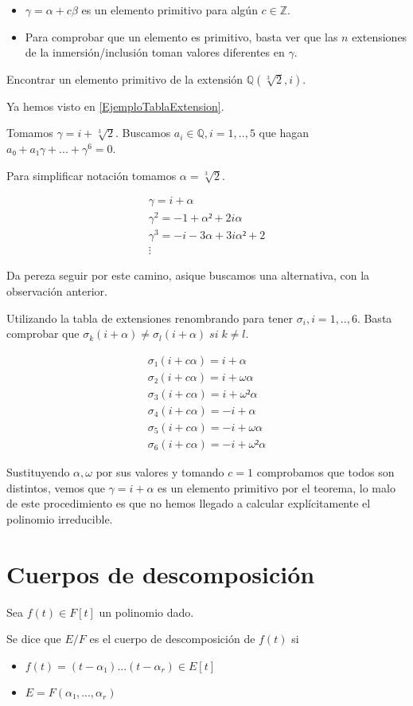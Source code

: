 \documentclass{apuntes}
\begin{document}
\obs
\begin{itemize}
\item $γ=α+cβ$ es un elemento primitivo para algún $c∈ℤ$.
\item Para comprobar que un elemento es primitivo, basta ver que las $n$ extensiones de la inmersión/inclusión toman valores diferentes en $γ$.
\end{itemize}


\begin{example}
Encontrar un elemento primitivo de la extensión $ℚ(\sqrt[3]{2},i)$.

Ya hemos visto en \ref{EjemploTablaExtension}.

Tomamos $γ=i+\sqrt[3]{2}$. Buscamos $a_i ∈ℚ, i=1,..,5$ que hagan $a₀  + a₁γ + ... + γ^6 = 0$.

Para simplificar notación tomamos $α = \sqrt[3]{2}$.

\begin{gather*}
γ=i+α\\γ^2=-1+α²+2iα\\γ^3=-i-3α+3iα²+2\\\vdots
\end{gather*}

Da pereza seguir por este camino, asique buscamos una alternativa, con la observación anterior.

Utilizando la tabla de extensiones renombrando para tener $σ_i, i=1,..,6$. Basta comprobar que $σ_k (i+α) ≠ σ_l(i+α)\;si\;k≠l$.

\begin{gather*}
σ₁(i+cα) = i+α\\
σ₂(i+cα) = i+ωα\\
σ_3(i+cα) = i+ω²α\\
σ_4(i+cα) = -i+α\\
σ_5(i+cα) = -i+ωα\\
σ_6(i+cα) =  -i+ω²α
\end{gather*}

Sustituyendo $α,ω$ por sus valores y tomando $c=1$ comprobamos que todos son distintos, vemos que $γ=i+α$ es un elemento primitivo por el teorema, lo malo de este procedimiento es que no hemos llegado a calcular explícitamente el polinomio irreducible.
\end{example}


\section{Cuerpos de descomposición}

\begin{defn}
Sea $f(t) ∈F[t]$ un polinomio dado.

Se dice que $E/F$ es el cuerpo de descomposición de $f(t)$ si
\begin{itemize}
\item $f(t) = (t-α₁) ... (t-α_r) ∈E[t]$
\item $E=F(α₁,...,α_r)$
\end{itemize}
\end{defn}
\end{document}
